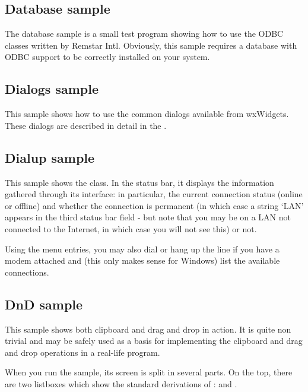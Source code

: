 \subsection{Database sample}\label{sampledb}

The database sample is a small test program showing how to use the ODBC
classes written by Remstar Intl.  Obviously, this sample requires a
database with ODBC support to be correctly installed on your system.


\subsection{Dialogs sample}\label{sampledialogs}

This sample shows how to use the common dialogs available from wxWidgets. These
dialogs are described in detail in the .


\subsection{Dialup sample}\label{sampledialup}

This sample shows the 
class. In the status bar, it displays the information gathered through its
interface: in particular, the current connection status (online or offline) and
whether the connection is permanent (in which case a string `LAN' appears in
the third status bar field - but note that you may be on a LAN not
connected to the Internet, in which case you will not see this) or not.

Using the menu entries, you may also dial or hang up the line if you have a
modem attached and (this only makes sense for Windows) list the available
connections.


\subsection{DnD sample}\label{samplednd}

This sample shows both clipboard and drag and drop in action. It is quite non
trivial and may be safely used as a basis for implementing the clipboard and
drag and drop operations in a real-life program.

When you run the sample, its screen is split in several parts. On the top,
there are two listboxes which show the standard derivations of
:
 and
.

